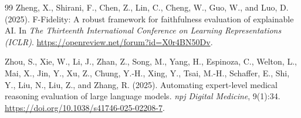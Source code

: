 \documentclass[fleqn,10pt,lineno]{wlpeerj}
\begin{document}
\begin{thebibliography}{99}
Zheng, X., Shirani, F., Chen, Z., Lin, C., Cheng, W., Guo, W., and
Luo, D. (2025).
F-Fidelity: A robust framework for faithfulness evaluation of explainable AI.
In \emph{The Thirteenth International Conference on Learning
Representations (ICLR)}.
\url{https://openreview.net/forum?id=X0r4BN50Dv}.

Zhou, S., Xie, W., Li, J., Zhan, Z., Song, M., Yang, H., Espinoza, C.,
Welton, L., Mai, X., Jin, Y., Xu, Z., Chung, Y.-H., Xing, Y., Tsai, M.-H.,
Schaffer, E., Shi, Y., Liu, N., Liu, Z., and Zhang, R. (2025).
Automating expert-level medical reasoning evaluation of large language
models.
\emph{npj Digital Medicine}, 9(1):34.
\url{https://doi.org/10.1038/s41746-025-02208-7}.

\end{thebibliography}
\end{document}
